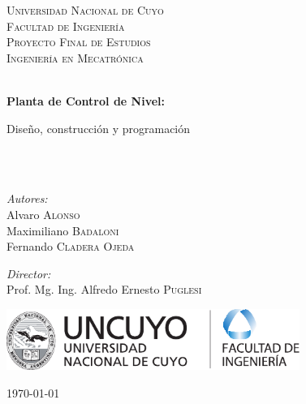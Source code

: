 \begin{titlepage}

\begin{center}


\textsc{\LARGE Universidad Nacional de Cuyo}\\[1.5cm]
\textsc{\LARGE Facultad de Ingeniería}\\[1.5cm]

\textsc{\Large Proyecto Final de Estudios}\\[0.5cm]
\textsc{\Large Ingeniería en Mecatrónica }\\[0.5cm]

\HRule \\[0.4cm]
{ \huge \bfseries Planta de Control de Nivel:

Diseño, construcción y programación}\\[0.4cm]

\HRule \\[1.5cm]

\begin{minipage}{0.4\textwidth}
\begin{flushleft} \large
\emph{Autores:}\\
Alvaro \textsc{Alonso} \\
Maximiliano \textsc{Badaloni} \\
Fernando \textsc{Cladera Ojeda}
\end{flushleft}
\end{minipage}
\begin{minipage}{0.4\textwidth}
\begin{flushright} \large
\emph{Director:} \\
Prof. Mg. Ing. Alfredo Ernesto \textsc{Puglesi}
\end{flushright}
\end{minipage}

\vfill

\begin{minipage}[c]{0.9\textwidth}
  \centering
  \includegraphics[height=20mm]{Caratula/Logos/LogoFacu.pdf}
\end{minipage}

\vspace{1cm}

{\large \today}

\end{center}

\end{titlepage}